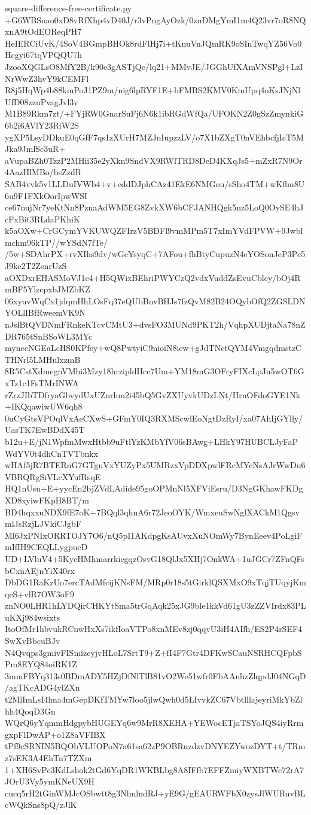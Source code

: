 \documentclass[11pt]{article}
\theoremstyle{definition}
\theoremstyle{remark}
\begin{document}
\begin{filecontents*}[overwrite]{square-difference-free-certificate.py}
+G6WBSnao0xD8vRfXhp4vD40J/r3vPngAyOzk/0znDMgYmI1m4Q23vr7oR8NQxnA9tOdEOReqPH7
HeIERCiUvK/4SoV4BGmpBHOk8rdFlHj7i+tKnuVnJQmRK9oSInTwqYZ56Vo0Hcgyi67tqVPQQU7h
JzooXQGLsO8MfY2B/k90e3gASTjQc/lq21+MMvJE/JGGhUfXAmVNSPgl+LzINrWwZ3hvY9kCEMFl
R8j5HqWp4b88kmPoJ1PZ9m/nig6lpRYF1E+bFMBS2KMV0KmUpq4oKsJNjNlUfD08zzuPvagJvl3v
M1B89Rkm7zt/+FYjRW0GnarSuFj6N6k1ibRGdWfQa/UFOKN2Z0gSzZmynkiG6b2i6AVlY23RiW2S
ygXP5LsyDDkuE0qGfF7qs1zXUrH7MZJnIupzzLV/o7X1bZXgT0nVEhbcfjIcT5MJka9JmlSc3uR+
aVupaBZh0TzzP2MHii35e2yXkn9SndVX9RWlTRD8DeD4KXqJs5+mZxR7N9Or4AazHlMBo/bsZzdR
SAB4vvk5v1LLDuIVWb4+v+eddDJphCAz41EkE6NMGou/sSho4TM+wKflm8U6u9F1FXkOorIpwWSI
ce67nujNr7yeKtNn8PznaAdWM5EG8ZvkXW6bCFJANHQgk5nz5LoQ0OySE4hJcFxBit3RLdaPKhiK
k5aOXw+CrGCymYVKUWQZFIrzV5BDFl9vmMPm5T7xImYVdFPVW+9Jwblmchm96kTP//wYSdN7fTe/
/5w+SDAhrPX+rvXIhs9dv/wGcYsyqC+7AFou+fhBtyCupuzN4eYOSonJeP3Pc5J9ke2T2ZsnrUzS
aOXDxrEHASMoVJ1c4+H5QWixBEhriPWYCzQ2vdxVuddZsEvuCblcy/bOj4RmBF5YlzcpxbJMZbKZ
06xyuvWqCx1jdqmHhLOsFq37eQUbBnvBHJs7fzQvM82B24OQybOfQ2ZGSLDNYOLlIBfRweemVK9N
nJslBtQVDNmFRnkeKTcvCMtU3+dvsFO3MUNd9PKT2h/VqhpXUDjtaNa78nZDR765tSnBSoWL3MYc
mynecNGEaLcHS0KPfey+wQ8PwtyiC9nioiN8iew+gJdTNctQYM4VmgqdmstzCTHNrl5LMHulxzmB
8R5CstXdmegnVMhi3Mzy18hrzipldHcc7Um+YM18mG3OFryFIXcLpJu5wOT6GxTz1c1FsTMrINWA
rZrzJIbTDfryaGbvydUxUZnrhm2i45bQ5GvZXUyvkUDzLNt/HrnOFdoGYE1Nk+IKQqawiwUW6qh8
0uCyGtsVPOqlVxAeCXwS+GFmY0IQ3RXMScwlEoNgtDzRyI/xa07AhIjGYlly/UasTK7EwBDdX45T
b12u+E/jN1WpfmMwxHtbb9uFtlYzKMbYfV06sBAwg+LHkY97HUBCLJyFaPWdYV0t4dhCnTVTbnkx
wHAf5jR7BTERnG7GTguVxYUZyPx5UMRzxVpDDXpwlFRcMYcNsAJrWwDu6VBRQRgSiVLcXYufRsqE
HQ1nUsn+E+yycEn2bjZVdLAdide95goOPMnNl5XFViEsru/D3NgGKhawFKDgXD8xyiwFKpH8BT/m
BD4hqxxuNDX9fE7oK+7BQql3qhnA6r72JeoOYK/WmxeuSwNglXACkM1QgsvmlJsRzjLJVkiCJgbF
Ml6JxPNIxORRTOJY7O6/nQ5pI1AKdpgKsAUvxXuNOmWy7BynEeev4PoLgiFmIfIH9CEQLLygpueD
UD+LVluV4+5KycHMhmarrkiegqzOsvG18QlJx5XHj7OnkWA+1uJGCr7ZFnQFsbCxnAEjnYiX40rx
DbDG1RaKzUo7ercTAdMfcijKNsFM/MRp0r18s5tGirklQSXMxO9xTqjTUqyjKmqeS+vlR7OW3oF9
znNO0LHR1hLYDQirCHKYtSma5trGqAqk25xJG9ble1kkVd61gU3zZZVIrdx83PLuKXj984wsixts
ItoOfMr1hbvukRCnwHxXs7ikfIoaVTPo8xnMEv8zj0qqvU3iH4AIfh/ES2P4rSEF4SwXvBbcuBJv
N4Qvqps3gmivFISmizeyjvHLoL7SrtT9+Z+fI4F7Gtr4DFKwSCauNSRHCQFpbSPm8EYQ84oiRK1Z
3mmFBYq313s0BDmADY5HZjDfNlTlB81vO2We51wfr0FbAAnbzZlqpdJ04NGqD/agTKcADG4ylZXn
t2MlImLsI4lma4mGepDKfTMYw7loo5jlwQwh0d5LIvvkZC67VbtlllajeyriMkYbZlhh4QoqD3Gn
WQrQ6yYqmmHdgpybHUGEYq6w9MrR8XEHA+YEWocETjaTSYoJQS4iyRrmgxpFlDwAP+o1Z8aVFIBX
tPf9cSRNIN5BQObVLUOPoN7a61sa62zP9OBRnzdzvDNYEZYwozDYT+t/TRmz7sEK3A4EhTn7TZXm
1+XH6SvPc3KdLshok2tGd6YqDR1WKBLbg8A8IFfb7EFFZmiyWXBTWc72rA7JOrU3Vy5ymKNeUX9H
cucq5rH2tGinWMJcOSbwtt8g3NlmlndRJ+yE9G/gEAURWFbX0zysJlWURuvBLcWQkSns8pQ/zJlK

\end{filecontents*}
\end{document}
